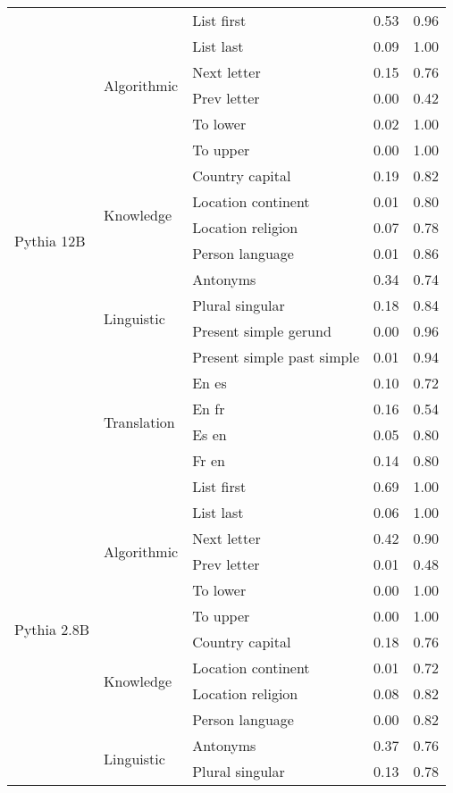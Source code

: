 \begin{center}
\begin{longtable}{lllrr}
\cline{1-5} \cline{2-5}
\multirow[t]{18}{*}{Pythia 12B} & \multirow[t]{6}{*}{Algorithmic} & List first & 0.53 & 0.96 \\
 &  & List last & 0.09 & 1.00 \\
 &  & Next letter & 0.15 & 0.76 \\
 &  & Prev letter & 0.00 & 0.42 \\
 &  & To lower & 0.02 & 1.00 \\
 &  & To upper & 0.00 & 1.00 \\
\cline{2-5}
 & \multirow[t]{4}{*}{Knowledge} & Country capital & 0.19 & 0.82 \\
 &  & Location continent & 0.01 & 0.80 \\
 &  & Location religion & 0.07 & 0.78 \\
 &  & Person language & 0.01 & 0.86 \\
\cline{2-5}
 & \multirow[t]{4}{*}{Linguistic} & Antonyms & 0.34 & 0.74 \\
 &  & Plural singular & 0.18 & 0.84 \\
 &  & Present simple gerund & 0.00 & 0.96 \\
 &  & Present simple past simple & 0.01 & 0.94 \\
\cline{2-5}
 & \multirow[t]{4}{*}{Translation} & En es & 0.10 & 0.72 \\
 &  & En fr & 0.16 & 0.54 \\
 &  & Es en & 0.05 & 0.80 \\
 &  & Fr en & 0.14 & 0.80 \\
\cline{1-5} \cline{2-5}
\multirow[t]{18}{*}{Pythia 2.8B} & \multirow[t]{6}{*}{Algorithmic} & List first & 0.69 & 1.00 \\
 &  & List last & 0.06 & 1.00 \\
 &  & Next letter & 0.42 & 0.90 \\
 &  & Prev letter & 0.01 & 0.48 \\
 &  & To lower & 0.00 & 1.00 \\
 &  & To upper & 0.00 & 1.00 \\
\cline{2-5}
 & \multirow[t]{4}{*}{Knowledge} & Country capital & 0.18 & 0.76 \\
 &  & Location continent & 0.01 & 0.72 \\
 &  & Location religion & 0.08 & 0.82 \\
 &  & Person language & 0.00 & 0.82 \\
\cline{2-5}
 & \multirow[t]{4}{*}{Linguistic} & Antonyms & 0.37 & 0.76 \\
 &  & Plural singular & 0.13 & 0.78 \\

\end{longtable}
\end{center}
